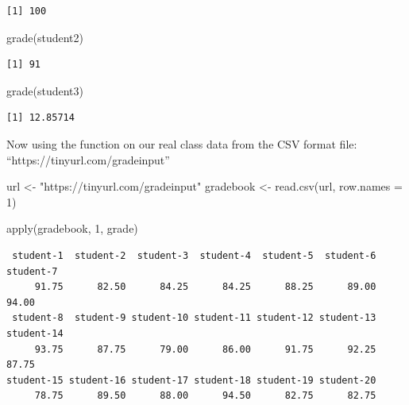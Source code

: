 \documentclass[
  letterpaper,
  DIV=11,
  numbers=noendperiod]{scrartcl}
\newenvironment{Shaded}{\begin{snugshade}}{\end{snugshade}}
\newcommand{\AttributeTok}[1]{\textcolor[rgb]{0.40,0.45,0.13}{#1}}
\newcommand{\DecValTok}[1]{\textcolor[rgb]{0.68,0.00,0.00}{#1}}
\newcommand{\FunctionTok}[1]{\textcolor[rgb]{0.28,0.35,0.67}{#1}}
\newcommand{\NormalTok}[1]{\textcolor[rgb]{0.00,0.23,0.31}{#1}}
\newcommand{\OtherTok}[1]{\textcolor[rgb]{0.00,0.23,0.31}{#1}}
\newcommand{\StringTok}[1]{\textcolor[rgb]{0.13,0.47,0.30}{#1}}
\begin{document}
\begin{verbatim}
[1] 100
\end{verbatim}

\begin{Shaded}
\begin{Highlighting}[]
\FunctionTok{grade}\NormalTok{(student2)}
\end{Highlighting}
\end{Shaded}

\begin{verbatim}
[1] 91
\end{verbatim}

\begin{Shaded}
\begin{Highlighting}[]
\FunctionTok{grade}\NormalTok{(student3)}
\end{Highlighting}
\end{Shaded}

\begin{verbatim}
[1] 12.85714
\end{verbatim}

Now using the function on our real class data from the CSV format file:
``https://tinyurl.com/gradeinput''

\begin{Shaded}
\begin{Highlighting}[]
\NormalTok{url }\OtherTok{\textless{}{-}} \StringTok{"https://tinyurl.com/gradeinput"}
\NormalTok{gradebook }\OtherTok{\textless{}{-}} \FunctionTok{read.csv}\NormalTok{(url, }\AttributeTok{row.names =} \DecValTok{1}\NormalTok{)}
\end{Highlighting}
\end{Shaded}

\begin{Shaded}
\begin{Highlighting}[]
\FunctionTok{apply}\NormalTok{(gradebook, }\DecValTok{1}\NormalTok{, grade)}
\end{Highlighting}
\end{Shaded}

\begin{verbatim}
 student-1  student-2  student-3  student-4  student-5  student-6  student-7 
     91.75      82.50      84.25      84.25      88.25      89.00      94.00 
 student-8  student-9 student-10 student-11 student-12 student-13 student-14 
     93.75      87.75      79.00      86.00      91.75      92.25      87.75 
student-15 student-16 student-17 student-18 student-19 student-20 
     78.75      89.50      88.00      94.50      82.75      82.75 
\end{verbatim}
\end{document}
